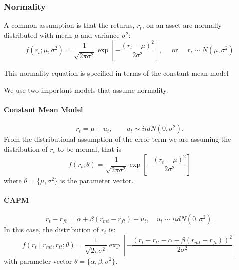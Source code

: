 \documentclass[11pt]{article}
\begin{document}
\subsubsection{Normality}
A common assumption is that the returns, $r_t$, on an asset are normally distributed with mean $\mu$ and variance $\sigma^2$:
\begin{equation}
\label{Normal distribution}
f\left(r_t ; \mu, \sigma^2\right)=\frac{1}{\sqrt{2 \pi \sigma^2}} \exp \left[-\frac{\left(r_t-\mu\right)^2}{2 \sigma^2}\right], \quad \text { or } \quad r_t \sim N\left(\mu, \sigma^2\right)
\end{equation}
\begin{note}
    This normality equation is specified in terms of the constant mean model
\end{note}

We use two important models that assume normality.

\paragraph{Constant Mean Model} \mbox{}
\begin{equation}
    \label{constant mean model}
    r_t = \mu + u_t, \qquad u_t \sim iid N(0,\sigma^2).
\end{equation}
From the distributional assumption of the error term we are assuming the distribution of $r_t$ to be normal, that is
\begin{equation}
f\left(r_t ; \theta\right)=\frac{1}{\sqrt{2 \pi \sigma^2}} \exp \left[-\frac{\left(r_t-\mu\right)^2}{2 \sigma^2}\right]
\end{equation}
where $\theta = \{\mu, \sigma^2\}$ is the parameter vector.

\paragraph{CAPM} \mbox{}

\begin{equation}
r_t-r_{f t}=\alpha+\beta\left(r_{m t}-r_{f t}\right)+u_t, \quad u_t \sim i i d N\left(0, \sigma^2\right) .
\end{equation}
In this case, the distribution of $r_t$ is:
\begin{equation}
f\left(r_t \mid r_{m t}, r_{t t} ; \theta\right)=\frac{1}{\sqrt{2 \pi \sigma^2}} \exp \left[-\frac{\left(r_t-r_{t t}-\alpha-\beta\left(r_{m t}-r_{f t}\right)\right)^2}{2 \sigma^2}\right]
\end{equation}
with parameter vector $\theta=\{\alpha,\beta,\sigma^2\}$.
\end{document}
